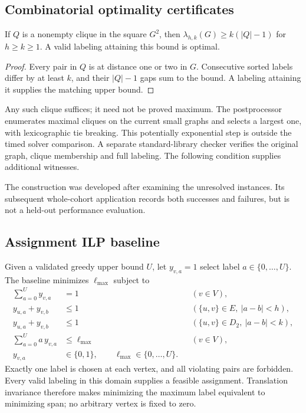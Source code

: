 \subsection{Combinatorial optimality certificates}
\begin{proposition}\label{prop:square-clique}
If $Q$ is a nonempty clique in the square $G^2$, then
$\lambda_{h,k}(G)\geq k(|Q|-1)$ for $h\geq k\geq1$.
A valid labeling attaining this bound is optimal.
\end{proposition}
\begin{proof}
Every pair in $Q$ is at distance one or two in $G$. Consecutive sorted
labels differ by at least $k$, and their $|Q|-1$ gaps sum to the bound.
A labeling attaining it supplies the matching upper bound.
\end{proof}
Any such clique suffices; it need not be proved maximum. The postprocessor
enumerates maximal cliques on the current small graphs and selects a
largest one, with lexicographic tie breaking. This potentially exponential
step is outside the timed solver comparison. A separate standard-library
checker verifies the original graph, clique membership and full labeling.
The following condition supplies additional witnesses.


The construction was developed after examining the unresolved instances.
Its subsequent whole-cohort application records both successes and
failures, but is not a held-out performance evaluation.


\subsection{Assignment ILP baseline}
Given a validated greedy upper bound $U$, let $y_{v,a}=1$ select label
$a\in\{0,\ldots,U\}$. The baseline minimizes $\ell_{\max}$ subject to
\begin{align}
 \sum_{a=0}^{U}y_{v,a}&=1 &&(v\in V),\\
 y_{u,a}+y_{v,b}&\leq1 &&(\{u,v\}\in E,\ |a-b|<h),\\
 y_{u,a}+y_{v,b}&\leq1 &&(\{u,v\}\in D_2,\ |a-b|<k),\\
 \sum_{a=0}^{U}a\,y_{v,a}&\leq\ell_{\max} &&(v\in V),\\
 y_{v,a}&\in\{0,1\},\qquad \ell_{\max}\in\{0,\ldots,U\}.
\end{align}
Exactly one label is chosen at each vertex, and all violating pairs are
forbidden. Every valid labeling in this domain supplies a feasible
assignment. Translation invariance therefore makes minimizing the maximum
label equivalent to minimizing span; no arbitrary vertex is fixed to zero.

